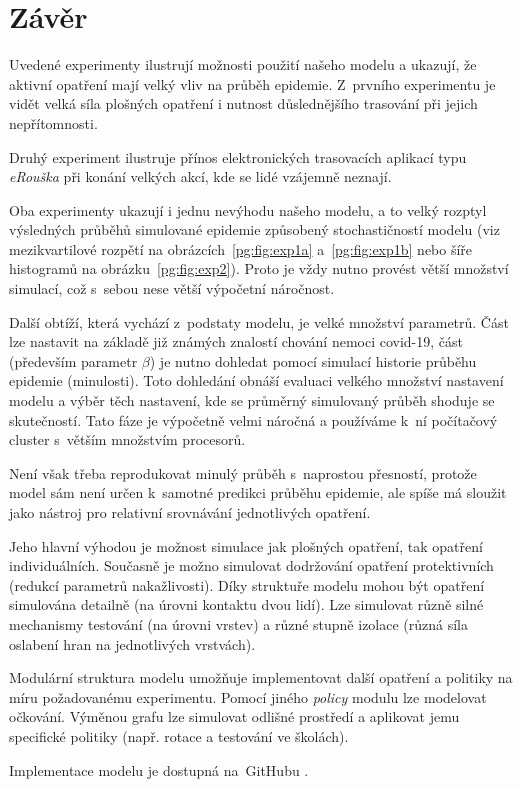\section*{Závěr}

Uvedené experimenty ilustrují možnosti použití našeho modelu a
ukazují, že aktivní opatření mají velký vliv na průběh epidemie.
Z~prvního experimentu je vidět velká síla plošných opatření i nutnost
důslednějšího trasování při jejich nepřítomnosti.

Druhý experiment ilustruje přínos elektronických trasovacích aplikací
typu {\em eRou\-ška} při konání velkých akcí, kde se lidé vzájemně
neznají.

Oba experimenty ukazují i jednu nevýhodu našeho modelu, a to velký rozptyl 
výsledných průběhů simulované epidemie způsobený stochastičností modelu (viz mezikvartilové rozpětí na
obrázcích~\ref{pg:fig:exp1a} a~\ref{pg:fig:exp1b} nebo šíře histogramů
na obrázku~\ref{pg:fig:exp2}). Proto je vždy nutno provést větší množství
simulací, což s~sebou nese větší výpočetní náročnost.

Další obtíží, která vychází z~podstaty modelu, je velké množství parametrů. Část lze nastavit na základě
již známých znalostí chování nemoci covid-19, část (především parametr $\beta$) je nutno dohledat pomocí simulací historie průběhu epidemie (minulosti). Toto dohledání obnáší evaluaci velkého množství nastavení modelu a výběr těch nastavení, kde se průměrný simulovaný průběh shoduje se skutečností. Tato fáze je výpočetně velmi náročná a používáme k~ní počítačový cluster s~větším množstvím procesorů. 

Není však třeba reprodukovat minulý průběh s~naprostou přesností, protože model sám není určen k~samotné predikci průběhu epidemie, ale spíše má sloužit jako nástroj pro relativní srovnávání jednotlivých opatření. 

Jeho hlavní výhodou je možnost simulace jak plošných o\-pat\-ře\-ní, tak
opatření individuálních. Současně je možno simulovat dodržování
opatření protektivních (redukcí parametrů nakažlivosti). Díky
struktuře modelu mohou být opatření simulována detailně (na úrovni
kontaktu dvou lidí). Lze simulovat různě silné mechanismy testování
(na úrovni vrstev) a různé stupně izolace (různá síla oslabení hran
na jednotlivých vrstvách).


Modulární struktura modelu umožňuje implementovat další opatření a
politiky na míru požadovanému experimentu. Pomocí jiného {\em policy}
modulu lze modelovat očkování. Výměnou grafu lze simulovat odlišné
prostředí a aplikovat jemu specifické politiky (např. rotace a testování
ve školách).


Implementace modelu je dostupná na~GitHubu \cite{pg:mmsoft}.

